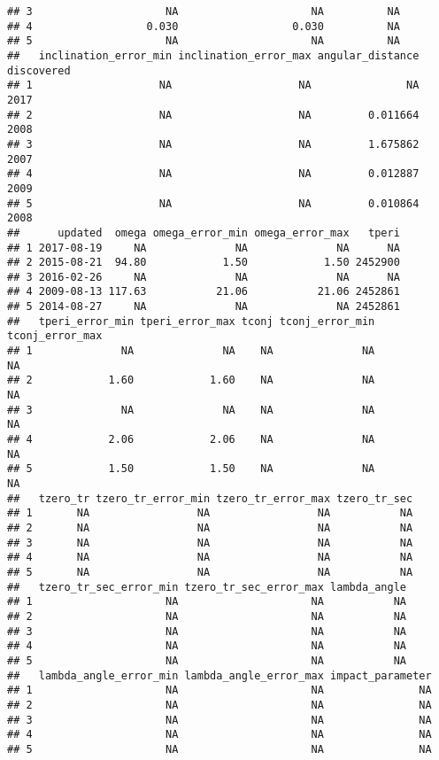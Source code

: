 \documentclass[]{article}
\begin{document}
\begin{verbatim}
## 3                     NA                     NA          NA
## 4                  0.030                  0.030          NA
## 5                     NA                     NA          NA
##   inclination_error_min inclination_error_max angular_distance discovered
## 1                    NA                    NA               NA       2017
## 2                    NA                    NA         0.011664       2008
## 3                    NA                    NA         1.675862       2007
## 4                    NA                    NA         0.012887       2009
## 5                    NA                    NA         0.010864       2008
##      updated  omega omega_error_min omega_error_max   tperi
## 1 2017-08-19     NA              NA              NA      NA
## 2 2015-08-21  94.80            1.50            1.50 2452900
## 3 2016-02-26     NA              NA              NA      NA
## 4 2009-08-13 117.63           21.06           21.06 2452861
## 5 2014-08-27     NA              NA              NA 2452861
##   tperi_error_min tperi_error_max tconj tconj_error_min tconj_error_max
## 1              NA              NA    NA              NA              NA
## 2            1.60            1.60    NA              NA              NA
## 3              NA              NA    NA              NA              NA
## 4            2.06            2.06    NA              NA              NA
## 5            1.50            1.50    NA              NA              NA
##   tzero_tr tzero_tr_error_min tzero_tr_error_max tzero_tr_sec
## 1       NA                 NA                 NA           NA
## 2       NA                 NA                 NA           NA
## 3       NA                 NA                 NA           NA
## 4       NA                 NA                 NA           NA
## 5       NA                 NA                 NA           NA
##   tzero_tr_sec_error_min tzero_tr_sec_error_max lambda_angle
## 1                     NA                     NA           NA
## 2                     NA                     NA           NA
## 3                     NA                     NA           NA
## 4                     NA                     NA           NA
## 5                     NA                     NA           NA
##   lambda_angle_error_min lambda_angle_error_max impact_parameter
## 1                     NA                     NA               NA
## 2                     NA                     NA               NA
## 3                     NA                     NA               NA
## 4                     NA                     NA               NA
## 5                     NA                     NA               NA

\end{verbatim}
\end{document}
